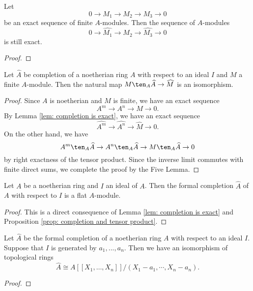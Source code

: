     \begin{lemma}\label{lem: completion is exact}
        Let 
        \[ 0 \to M_1 \to M_2 \to M_3 \to 0 \]
        be an exact sequence of finite \(A\)-modules.
        Then the sequence of \(\widehat{A}\)-modules
        \[ 0 \to \widehat{M_1} \to \widehat{M_2} \to \widehat{M_3} \to 0 \]
        is still exact.
    \end{lemma}
    \begin{proof}
    \end{proof}

    \begin{proposition}\label{prop: completion and tensor product}
        Let \(\widehat{A}\) be completion of a noetherian ring \(A\) with respect to an ideal \(I\) and \(M\) a finite \(A\)-module. 
        Then the natural map \(M \ten_A \widehat{A} \to \widehat{M}\) is an isomorphism.
    \end{proposition}
    \begin{proof}
        Since \(A\) is noetherian and \(M\) is finite, we have an exact sequence
        \[ A^m \to A^n \to M \to 0. \]
        By Lemma \ref{lem: completion is exact}, we have an exact sequence
        \[ \widehat{A^m} \to \widehat{A^n} \to \widehat{M} \to 0. \]
        On the other hand, we have
        \[ A^m \ten_A \widehat{A} \to A^n \ten_A \widehat{A} \to M \ten_A \widehat{A} \to 0 \]
        by right exactness of the tensor product.
        Since the inverse limit commutes with finite direct sums, we complete the proof by the Five Lemma.
    \end{proof}

    \begin{proposition}\label{prop: completion is flat}
        Let \(A\) be a noetherian ring and \(I\) an ideal of \(A\). 
        Then the formal completion \(\widehat{A}\) of \(A\) with respect to \(I\) is a flat \(A\)-module.
    \end{proposition}
    \begin{proof}
        This is a direct consequence of Lemma \ref{lem: completion is exact} and Proposition \ref{prop: completion and tensor product}.
    \end{proof}

    \begin{lemma}\label{lem: completion is isomorphic to image of power series}
        Let \(\widehat{A}\) be the formal completion of a noetherian ring \(A\) with respect to an ideal \(I\). 
        Suppose that \(I\) is generated by \(a_1,...,a_n\). 
        Then we have an isomorphism of topological rings
        \[ \widehat{A} \cong A[[X_1, \ldots, X_n]]/(X_1-a_1, \cdots, X_n-a_n). \]
    \end{lemma}
    \begin{proof}
    \end{proof}

